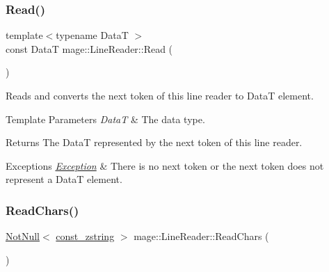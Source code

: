 \mbox{\label{classmage_1_1_line_reader_aa1ba5aa332e49bdd63ef4ee4021120fd}} 
\subsubsection{\texorpdfstring{Read()}{Read()}}
{\footnotesize\ttfamily template$<$typename DataT $>$ \\
const DataT mage\+::\+Line\+Reader\+::\+Read (\begin{DoxyParamCaption}{ }\end{DoxyParamCaption})\hspace{0.3cm}{\ttfamily [protected]}}

Reads and converts the next token of this line reader to {\ttfamily DataT} element.


\begin{DoxyTemplParams}{Template Parameters}
{\em DataT} & The data type. \\
\hline
\end{DoxyTemplParams}
\begin{DoxyReturn}{Returns}
The {\ttfamily DataT} represented by the next token of this line reader. 
\end{DoxyReturn}

\begin{DoxyExceptions}{Exceptions}
{\em \mbox{\hyperlink{classmage_1_1_exception}{Exception}}} & There is no next token or the next token does not represent a {\ttfamily DataT} element. \\
\hline
\end{DoxyExceptions}
\mbox{\label{classmage_1_1_line_reader_afcb163cbc75ad1650437d809bbbc2d9b}} 
\subsubsection{\texorpdfstring{Read\+Chars()}{ReadChars()}}
{\footnotesize\ttfamily \mbox{\hyperlink{namespacemage_a8769f9d670d6b585ea306cb1062af94b}{Not\+Null}}$<$ \mbox{\hyperlink{namespacemage_abfd9206dc607ceb5d13ec68bf075a5c0}{const\+\_\+zstring}} $>$ mage\+::\+Line\+Reader\+::\+Read\+Chars (\begin{DoxyParamCaption}{ }\end{DoxyParamCaption})\hspace{0.3cm}{\ttfamily [protected]}}

